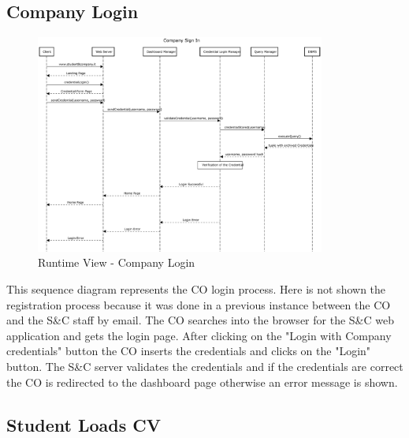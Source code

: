 \subsection{Company Login}
\label{sub:company-login}%

\begin{figure}[H]
      \centering
      \includegraphics[width=0.85\textwidth]{Images/RV_01b.pdf}
      \caption{Runtime View - Company Login}
      \label{fig:rv-company-login}
\end{figure}

\par This sequence diagram represents the CO login process. Here is not shown the registration process because it was done
in a previous instance between the CO and the S\&C staff by email. The CO searches into the browser for the S\&C 
web application and gets the login page. After clicking on the "Login with Company credentials" button the CO 
inserts the credentials and clicks on the "Login" button. The S\&C server validates the credentials and if the credentials
are correct the CO is redirected to the dashboard page otherwise an error message is shown.

\subsection{Student Loads CV}
\label{sub:student-loads-cv}%

